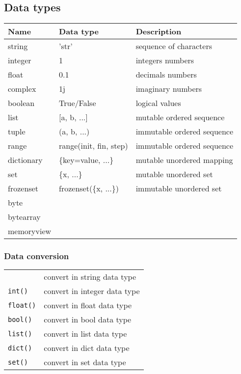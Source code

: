 \subsection{Data types}

\begin{tabularx}{\linewidth}{@{}| l | l | X |@{}}
    \hline
    Name & Data type & Description \\
    \hline
    string & 'str' & sequence of characters \\ 
    integer & 1 & integers numbers \\
    float & 0.1 & decimals numbers \\
    complex & 1j & imaginary numbers \\
    boolean & True/False & logical values \\
    list & [a, b, ...] & mutable ordered sequence \\
    tuple & (a, b, ...) & immutable ordered sequence \\
    range & range(init, fin, step) & immutable ordered sequence \\
    dictionary & \{key=value, ...\} & mutable unordered mapping \\
    set & \{x, ...\} &  mutable unordered set \\
    frozenset & frozenset(\{x, ...\}) & immutable unordered set \\
    byte & & \\
    bytearray & & \\
    memoryview & & \\
    \hline
\end{tabularx}



\subsubsection{Data conversion}

\begin{tabular}{@{}ll@{}}
    \verb!!    & convert in string data type \\
    \verb!int()!    & convert in integer data type \\
    \verb!float()!    & convert in float data type \\
    \verb!bool()!    & convert in bool data type \\
    \verb!list()!    & convert in list data type \\
    \verb!dict()!    & convert in dict data type \\
    \verb!set()!    & convert in set data type \\
\end{tabular}



